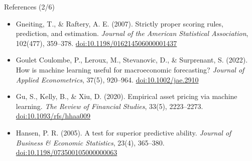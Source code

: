 \begin{frame}{References (2/6)}
\begin{itemize}
    \item Gneiting, T., \& Raftery, A. E. (2007). Strictly proper scoring rules, prediction, and estimation. \textit{Journal of the American Statistical Association}, 102(477), 359--378. \href{https://doi.org/10.1198/016214506000001437}{doi:10.1198/016214506000001437}
    \item Goulet Coulombe, P., Leroux, M., Stevanovic, D., \& Surprenant, S. (2022). How is machine learning useful for macroeconomic forecasting? \textit{Journal of Applied Econometrics}, 37(5), 920--964. \href{https://doi.org/10.1002/jae.2910}{doi:10.1002/jae.2910}
    \item Gu, S., Kelly, B., \& Xiu, D. (2020). Empirical asset pricing via machine learning. \textit{The Review of Financial Studies}, 33(5), 2223--2273. \href{https://doi.org/10.1093/rfs/hhaa009}{doi:10.1093/rfs/hhaa009}
    \item Hansen, P. R. (2005). A test for superior predictive ability. \textit{Journal of Business \& Economic Statistics}, 23(4), 365--380. \href{https://doi.org/10.1198/073500105000000063}{doi:10.1198/073500105000000063}
\end{itemize}
\end{frame}

